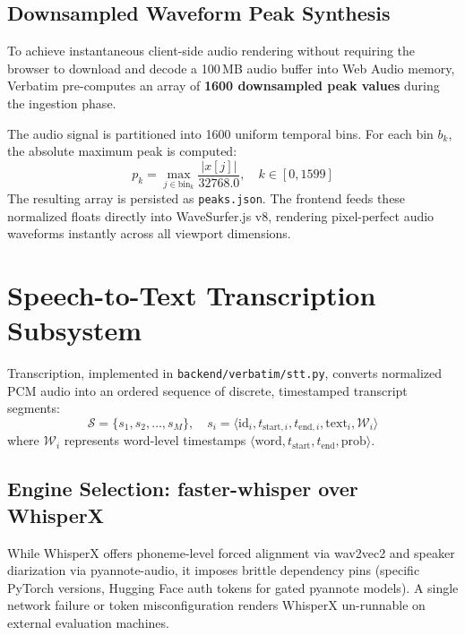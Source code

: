 \documentclass[10pt,a4paper]{article}
\begin{document}
\subsection{Downsampled Waveform Peak Synthesis}
To achieve instantaneous client-side audio rendering without requiring the browser to download and decode a 100\,MB audio buffer into Web Audio memory, Verbatim pre-computes an array of \textbf{1600 downsampled peak values} during the ingestion phase. 

The audio signal is partitioned into 1600 uniform temporal bins. For each bin $b_k$, the absolute maximum peak is computed:
\begin{equation}
p_k = \max_{j \in \text{bin}_k} \frac{|x[j]|}{32768.0}, \quad k \in [0, 1599]
\end{equation}
The resulting array is persisted as \texttt{peaks.json}. The frontend feeds these normalized floats directly into WaveSurfer.js v8, rendering pixel-perfect audio waveforms instantly across all viewport dimensions.

\section{Speech-to-Text Transcription Subsystem}
\label{sec:transcription}

Transcription, implemented in \texttt{backend/verbatim/stt.py}, converts normalized PCM audio into an ordered sequence of discrete, timestamped transcript segments:
\begin{equation}
\mathcal{S} = \{s_1, s_2, \dots, s_M\}, \quad s_i = \langle \text{id}_i, t_{\text{start}, i}, t_{\text{end}, i}, \text{text}_i, \mathcal{W}_i \rangle
\end{equation}
where $\mathcal{W}_i$ represents word-level timestamps $\langle \text{word}, t_{\text{start}}, t_{\text{end}}, \text{prob} \rangle$.

\subsection{Engine Selection: faster-whisper over WhisperX}
While WhisperX offers phoneme-level forced alignment via wav2vec2 and speaker diarization via pyannote-audio, it imposes brittle dependency pins (specific PyTorch versions, Hugging Face auth tokens for gated pyannote models). A single network failure or token misconfiguration renders WhisperX un-runnable on external evaluation machines.
\end{document}
